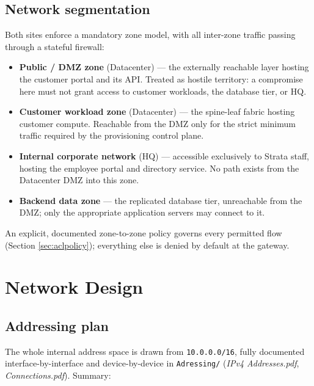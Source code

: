 \documentclass[11pt,a4paper]{report}
\begin{document}
\section{Network segmentation}

Both sites enforce a mandatory zone model, with all inter-zone traffic
passing through a stateful firewall:

\begin{itemize}[leftmargin=1.5em]
  \item \textbf{Public / DMZ zone} (Datacenter) --- the externally reachable
    layer hosting the customer portal and its API. Treated as hostile
    territory: a compromise here must not grant access to customer
    workloads, the database tier, or HQ.
  \item \textbf{Customer workload zone} (Datacenter) --- the spine-leaf
    fabric hosting customer compute. Reachable from the DMZ only for the
    strict minimum traffic required by the provisioning control plane.
  \item \textbf{Internal corporate network} (HQ) --- accessible exclusively
    to Strata staff, hosting the employee portal and directory service. No
    path exists from the Datacenter DMZ into this zone.
  \item \textbf{Backend data zone} --- the replicated database tier,
    unreachable from the DMZ; only the appropriate application servers may
    connect to it.
\end{itemize}

An explicit, documented zone-to-zone policy governs every permitted flow
(Section \ref{sec:aclpolicy}); everything else is denied by default at the
gateway.

\chapter{Network Design}

\section{Addressing plan}

The whole internal address space is drawn from \texttt{10.0.0.0/16},
fully documented interface-by-interface and device-by-device in
\texttt{Adressing/} (\emph{IPv4 Addresses.pdf}, \emph{Connections.pdf}).
Summary:
\end{document}
